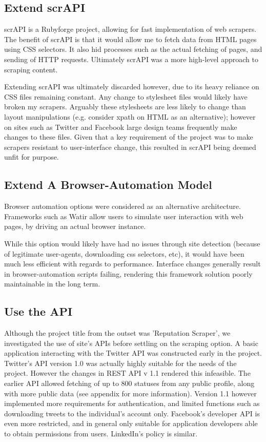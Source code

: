 \subsection{Extend scrAPI}

scrAPI is a Rubyforge project, allowing for fast implementation of web scrapers. The benefit of scrAPI is that it would allow me to fetch data from HTML pages using CSS selectors. It also hid processes such as the actual fetching of pages, and sending of HTTP requests. Ultimately scrAPI was a more high-level approach to scraping content.

Extending scrAPI was ultimately discarded however, due to its heavy reliance on CSS files remaining constant. Any change to stylesheet files would likely have broken my scrapers. Arguably these stylesheets are less likely to change than layout manipulations (e.g. consider xpath on HTML as an alternative); however on sites such as Twitter and Facebook large design teams frequently make changes to these files. Given that a key requirement of the project was to make scrapers resistant to user-interface change, this resulted in scrAPI being deemed unfit for purpose. 

\subsection{Extend A Browser-Automation Model}

Browser automation options were considered as an alternative architecture. Frameworks such as Watir allow users to simulate user interaction with web pages, by driving an actual browser instance.

While this option would likely have had no issues through site detection (because of legitimate user-agents, downloading css selectors, etc), it would have been much less efficient with regards to performance. Interface changes generally result in browser-automation scripts failing, rendering this framework solution poorly maintainable in the long term. 

\subsection{Use the API}

Although the project title from the outset was 'Reputation Scraper', we investigated the use of site's APIs before settling on the scraping option. A basic application interacting with the Twitter API was constructed early in the project. Twitter's API version 1.0 was actually highly suitable for the needs of the project. However the changes in REST API v 1.1 rendered this infeasible. The earlier API allowed fetching of up to 800 statuses from any public profile, along with more public data (see appendix for more information). Version 1.1 however implemented more requirements for authentication, and limited functions such as downloading tweets to the individual's account only. Facebook's developer API is even more restricted, and in general only suitable for application developers able to obtain permissions from users. LinkedIn's policy is similar. %

